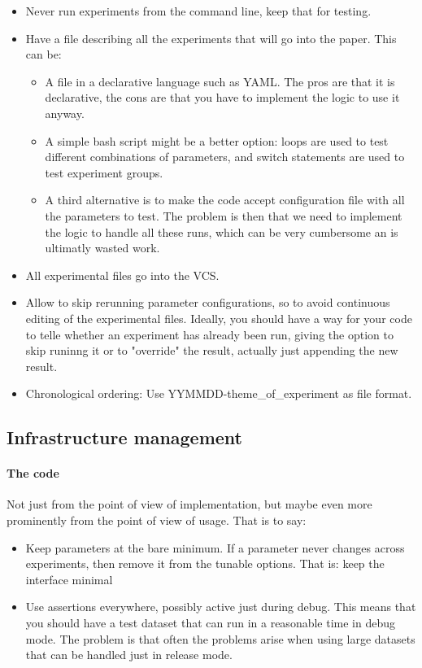\documentclass{llncs}
\begin{document}
\begin{itemize}
\item Never run experiments from the command line, keep that for testing.
\item Have a file describing all the experiments that will go into the paper. This
  can be:
  \begin{itemize}
  \item A file in a declarative language such as YAML. The pros are that it is
    declarative, the cons are that you have to implement the logic to use it
    anyway.
  \item A simple bash script might be a better option: loops are used to test
      different combinations of parameters, and switch statements are used to
      test experiment groups.
  \item A third alternative is to make the code accept configuration file with all
      the parameters to test. The problem is then that we need to implement the
      logic to handle all these runs, which can be very cumbersome an is
      ultimatly wasted work.
  \end{itemize}
\item All experimental files go into the VCS. 
\item Allow to skip rerunning parameter configurations, so to avoid continuous
  editing of the experimental files. Ideally, you should have a way for your
  code to telle whether an experiment has already been run, giving the option
  to skip runinng it or to "override" the result, actually just appending the
  new result.
 \item Chronological ordering: Use YYMMDD-theme\_of\_experiment as file format.
\end{itemize}

\subsection{Infrastructure management}

\paragraph{The code}

Not just from the point of view of implementation, but maybe even more
prominently from the point of view of usage. That is to say:

\begin{itemize}
\item Keep parameters at the bare minimum. If a parameter never changes across
  experiments, then remove it from the tunable options. That is: keep the
  interface minimal
\item Use assertions everywhere, possibly active just during debug. This means that
  you should have a test dataset that can run in a reasonable time in debug
  mode. The problem is that often the problems arise when using large datasets
  that can be handled just in release mode.
\end{itemize}
\end{document}
